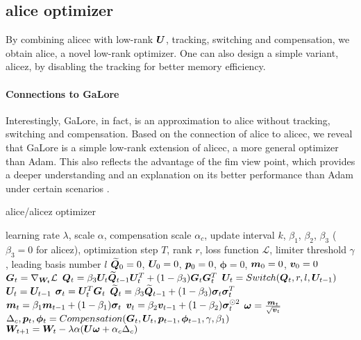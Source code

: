 \subsection{\Gls{alice} optimizer}
\label{subsec: alice optimizer}
By combining \gls{alicec} with low-rank ${\bm{U}}$, tracking, switching and compensation, we obtain \gls{alice}, a novel low-rank optimizer. One can also design a simple variant, \gls{alicez}, by disabling the tracking for better memory efficiency.
\paragraph{Connections to GaLore}
Interestingly, GaLore, in fact, is an approximation to \gls{alice} without tracking, switching and compensation. Based on the connection of \gls{alice} to \gls{alicec}, we reveal that GaLore is a simple low-rank extension of \gls{alicec}, a more general optimizer than Adam. This also reflects the advantage of the \gls{fim} view point, which provides a deeper understanding and an explanation on its better performance than Adam under certain scenarios \citep{zhao2024galore}.


\begin{algorithm}
\caption{\gls{alice}/\gls{alicez} optimizer}
\label{alg: alice optimizer}
    \begin{algorithmic}[1]
         learning rate $\lambda$, scale $\alpha$, compensation scale $\alpha_c$, update interval $k$, $\beta_1$, $\beta_2$, $\beta_3$ ($\beta_3=0$ for \gls{alicez}),  optimization step $T$, rank $r$, loss function $\mathcal{L}$, limiter threshold $\gamma$, leading basis number $l$ 
        \STATE $\widetilde{{\bm{Q}}}_0 = 0$, ${\bm{U}}_0=0$, ${\bm{p}}_0=0$, $\bm{\phi}=0$, ${\bm{m}}_0=0$, ${\bm{v}}_0=0$
            \STATE ${\bm{G}}_t=\nabla_{{\bm{W}}_t}\mathcal{L}$
                \STATE 
                ${\bm{Q}}_t=\beta_3{\bm{U}}_t\widetilde{{\bm{Q}}}_{t-1}{\bm{U}}_t^T+(1-\beta_3){\bm{G}}_t{\bm{G}}_t^T$ 
                \STATE ${\bm{U}}_t=Switch({\bm{Q}}_t, r, l, {\bm{U}}_{t-1})$
            \ELSE
                \STATE ${\bm{U}}_t={\bm{U}}_{t-1}$
            \ENDIF
            \STATE $\bm{\sigma}_t = {\bm{U}}_t^T{\bm{G}}_t$ 
            \STATE $\widetilde{{\bm{Q}}}_t = \beta_3 \widetilde{{\bm{Q}}}_{t-1} +(1-\beta_3)\bm{\sigma}_t\bm{\sigma}_t^T$ 
            \STATE ${\bm{m}}_t = \beta_1 {\bm{m}}_{t-1}+ (1-\beta_1)\bm{\sigma}_t$
            \STATE ${\bm{v}}_t = \beta_2 {\bm{v}}_{t-1} + (1-\beta_2) \bm{\sigma}_t^{\odot 2}$
            \STATE $\bm{\omega} = \frac{{\bm{m}}_t}{\sqrt{{\bm{v}}_t}}$
            \STATE $\Delta_c, {\bm{p}}_t, \bm{\phi}_t = Compensation({\bm{G}}_t, {\bm{U}}_t, {\bm{p}}_{t-1}, \bm{\phi}_{t-1}, \gamma, \beta_1)$ 
            \STATE ${\bm{W}}_{t+1}={\bm{W}}_t-\lambda\alpha ({\bm{U}}\bm{\omega}+\alpha_c\Delta_c)$
        \ENDFOR
    \end{algorithmic}
\end{algorithm}

